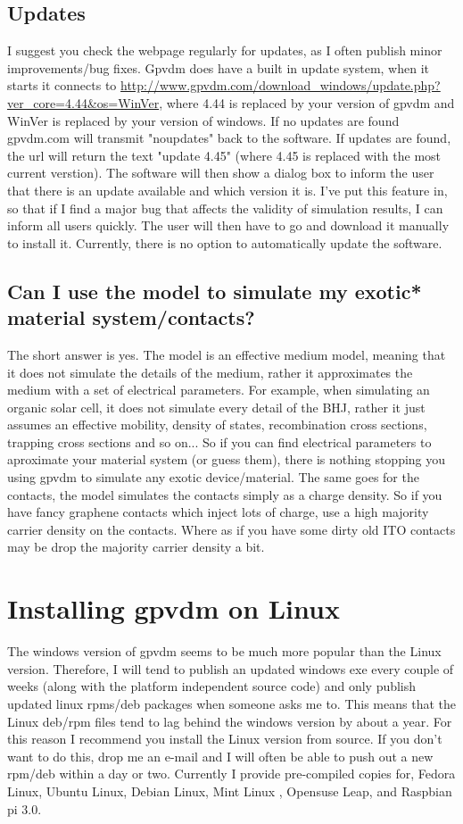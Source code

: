 \documentclass[11pt]{article}
\begin{document}
\subsection{Updates}
I suggest you check the webpage regularly for updates, as I often publish minor improvements/bug fixes.  Gpvdm does have a built in update system, when it starts it connects to  \url{http://www.gpvdm.com/download_windows/update.php?ver_core=4.44&os=WinVer}, where 4.44 is replaced by your version of gpvdm and WinVer is replaced by your version of windows.  If no updates are found gpvdm.com will transmit "noupdates" back to the software.  If updates are found, the url will return the text "update 4.45" (where 4.45 is replaced with the most current verstion).  The software will then show a dialog box to inform the user that there is an update available and which version it is.    I've put this feature in, so that if I find a major bug that affects the validity of simulation results, I can inform all users quickly.  The user will then have to go and download it manually to install it.  Currently, there is no option to automatically update the software. 

\subsection{Can I use the model to simulate my exotic* material system/contacts?}
The short answer is yes.  The model is an effective medium model, meaning that it does not simulate the details of the medium, rather it approximates the medium with a set of electrical parameters.  For example, when simulating an organic solar cell, it does not simulate every detail of the BHJ, rather it just assumes an effective mobility, density of states, recombination cross sections, trapping cross sections and so on...  So if you can find electrical parameters to aproximate your material system (or guess them), there is nothing stopping you using gpvdm to simulate any exotic device/material.  The same goes for the contacts, the model simulates the contacts simply as a charge density. So if you have fancy graphene contacts which inject lots of charge, use a high majority carrier density on the contacts.  Where as if you have some dirty old ITO contacts may be drop the majority carrier density a bit.

\section{Installing gpvdm on Linux} \label{installing_on_linux}
The windows version of gpvdm seems to be much more popular than the Linux version.  Therefore, I will tend to publish an updated windows exe every couple of weeks (along with the platform independent source code) and only publish updated linux rpms/deb packages when someone asks me to.  This means that the Linux deb/rpm files tend to lag behind the windows version by about a year.  For this reason I recommend you install the Linux version from source.  If you don't want to do this, drop me an e-mail and I will often be able to push out a new rpm/deb within a day or two.  Currently I provide pre-compiled copies for, Fedora Linux, Ubuntu Linux, Debian Linux, Mint Linux , Opensuse Leap, and Raspbian pi 3.0.
\end{document}
